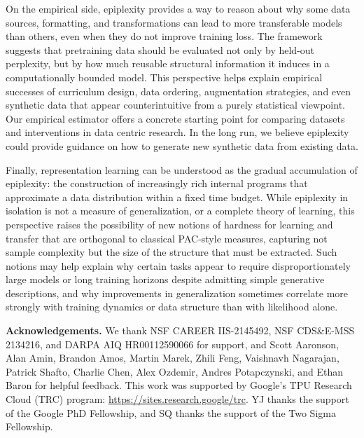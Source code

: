 \documentclass[twoside]{article}
\begin{document}
On the empirical side, epiplexity provides a way to reason about why some data sources, formatting, and transformations can lead to more transferable models than others, even when they do not improve training loss.
The framework suggests that pretraining data should be evaluated not only by held-out perplexity, but by how much reusable structural information it induces in a computationally bounded model.
This perspective helps explain empirical successes of curriculum design, data ordering, augmentation strategies, and even synthetic data that appear counterintuitive from a purely statistical viewpoint. 
Our empirical estimator offers a concrete starting point for comparing datasets and interventions in data centric research.
In the long run, we believe epiplexity could provide guidance on how to generate new synthetic data from existing data.

%

Finally, representation learning can be understood as the gradual accumulation of epiplexity: the construction of increasingly rich internal programs that approximate a data distribution within a fixed time budget. While epiplexity in isolation is not a measure of generalization, or a complete theory of learning, this perspective raises the possibility of new notions of hardness for learning and transfer that are orthogonal to classical PAC-style measures, capturing not sample complexity but the size of the structure that must be extracted. 
Such notions may help explain why certain tasks appear to require disproportionately large models or long training horizons despite admitting simple generative descriptions, and why improvements in generalization sometimes correlate more strongly with training dynamics or data structure than with likelihood alone. 

%
%

%



%

%
%

%
%




%



%
%
%

%

\vspace{5mm}
\textbf{Acknowledgements.} We thank NSF CAREER IIS-2145492, NSF CDS\&E-MSS 2134216, and DARPA AIQ
HR00112590066 for support, and Scott Aaronson, Alan Amin, Brandon Amos, Martin Marek, Zhili Feng, Vaishnavh Nagarajan, Patrick Shafto, Charlie Chen, Alex Ozdemir, Andres Potapczynski, and Ethan Baron for helpful feedback. This work was supported by 
Google’s TPU Research Cloud (TRC) program: \url{https://sites.research.google/trc}. YJ thanks the support of the Google PhD Fellowship, and SQ thanks the support of the Two Sigma Fellowship.
\end{document}
